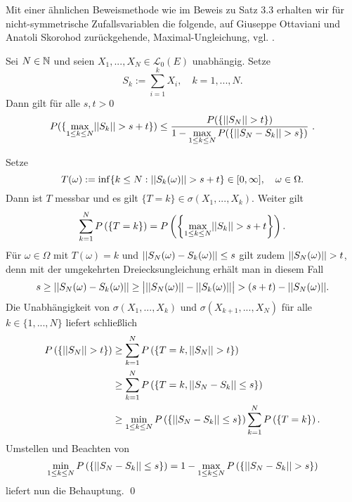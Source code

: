 Mit einer ähnlichen Beweismethode wie im Beweis zu Satz $3.3$ erhalten wir für nicht-symmetrische Zufallsvariablen die folgende, auf Giuseppe Ottaviani und Anatoli Skorohod zurückgehende, Maximal-Ungleichung, vgl. \cite[Lemma 6.2]{ledoux-talagrand}. 
\begin{theorem}
    Sei $N \in \mathbb{N}$ und seien $X_1,...,X_N \in \mathcal{L}_0(E)$ unabhängig. Setze 
    $$
        S_k := \sum_{i=1}^kX_i, \quad k = 1,...,N. 
    $$
    Dann gilt für alle $s,t > 0$
    \begin{align}
        P(\{ \max_{1 \leq k \leq N} \lvert\lvert S_k \rvert\rvert > s + t \}) \leq \frac{P(\{\lvert\lvert S_N \rvert\rvert > t \})}{1 - \max\limits_{1 \leq k \leq N}P(\{ \lvert\lvert S_N - S_k \rvert\rvert > s \})} \ . 
    \end{align}
\end{theorem}

\begin{proof*}
    Setze 
    $$
        T(\omega) := \inf\{k \leq N: \lvert\lvert S_k(\omega) \rvert\rvert > s + t\} \in [0, \infty], \quad \omega \in \Omega. 
    $$
    Dann ist $T$ messbar und es gilt $\{T = k\} \in \sigma(X_1,...,X_k)$. Weiter gilt 
    $$
        \sum_{k=1}^N P\left(\left\{ T = k \right\}\right) = P\left(\left\{ \max_{1\leq k \leq N}\lvert\lvert S_k \rvert\rvert > s+t \right\}\right).
    $$
    Für $\omega \in \Omega$ mit $T(\omega) = k$ und $\lvert\lvert S_N(\omega) - S_k(\omega) \rvert\rvert \leq s$ gilt zudem $\lvert\lvert S_N(\omega) \rvert\rvert > t$, denn mit der umgekehrten Dreiecksungleichung erhält man in diesem Fall
    $$
        s \geq \lvert\lvert S_N(\omega) - S_k(\omega) \rvert\rvert \geq \big\lvert\lvert\lvert S_N(\omega) \rvert\rvert-\lvert\lvert S_k(\omega) \rvert\rvert\big\rvert > (s+t) - \lvert\lvert S_N(\omega) \rvert\rvert.
    $$
    Die Unabhängigkeit von $\sigma(X_1,...,X_k)$  und $\sigma(X_{k+1},...,X_N)$ für alle $k \in \{1,...,N\}$ liefert schließlich
    \begin{align*}
        P\left(\left\{ \lvert\lvert S_N \rvert\rvert > t \right\}\right) &\geq \sum_{k=1}^N P\left(\left\{ T=k, \lvert\lvert S_N \rvert\rvert > t \right\}\right)  \\\
                              &\geq \sum_{k=1}^N P\left(\left\{ T=k, \lvert\lvert S_N - S_k \rvert\rvert \leq s \right\}\right) \\\
                              &\geq \min_{1\leq k \leq N}P\left(\left\{ \lvert\lvert S_N-S_k \rvert\rvert \leq s \right\}\right) \sum_{k=1}^N P\left(\left\{ T=k \right\}\right). 
    \end{align*}
    Umstellen und Beachten von 
    $$
        \min_{1\leq k \leq N}P\left(\left\{ \lvert\lvert S_N-S_k \rvert\rvert \leq s \right\}\right) = 1 - \max_{1\leq k \leq N}P\left(\left\{ \lvert\lvert S_N - S_k \rvert\rvert > s \right\}\right)
    $$
    liefert nun die Behauptung. \qed
\end{proof*}